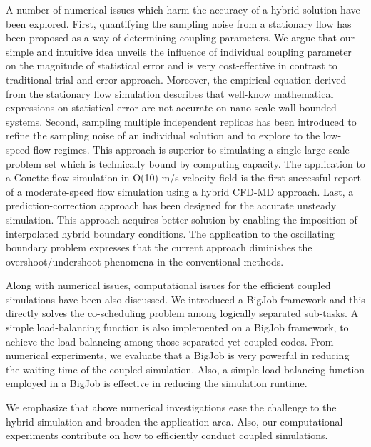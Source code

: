 \documentclass[]{aiaa-tc}%
\begin{document}
A number of numerical issues which harm the accuracy of a hybrid solution have been explored. First, quantifying the sampling noise from a stationary flow has been proposed as a way of determining coupling parameters. We argue that our simple and intuitive idea unveils the influence of individual coupling parameter on the magnitude of statistical error and is very cost-effective in contrast to traditional trial-and-error approach.
Moreover, the empirical equation derived from the stationary flow simulation describes that well-know mathematical expressions on statistical error are not accurate on nano-scale wall-bounded systems.
Second, sampling multiple independent replicas has been introduced to refine the sampling noise of an individual solution and to explore to the low-speed flow regimes. This approach is superior to simulating a single large-scale problem set which is technically bound by computing capacity. The application to a Couette flow simulation in O(10) m/s velocity field is the first successful report of a moderate-speed flow simulation using a hybrid CFD-MD approach.
Last, a prediction-correction approach has been designed for the accurate unsteady simulation. This approach acquires better solution by enabling the imposition of interpolated hybrid boundary conditions. The application to the oscillating boundary problem expresses that the current approach diminishes the overshoot/undershoot phenomena in the conventional methods.

Along with numerical issues, computational issues for the efficient coupled simulations have been also discussed. We introduced a BigJob framework and this directly solves the co-scheduling problem among logically separated sub-tasks. A simple load-balancing function is also implemented on a BigJob framework, to achieve the load-balancing among those separated-yet-coupled codes. From numerical experiments, we evaluate that a BigJob is very powerful in reducing the waiting time of the coupled simulation. Also, a simple load-balancing function employed in a BigJob is effective in reducing the simulation runtime.

We emphasize that above numerical investigations ease the challenge to the hybrid simulation and broaden the application area. Also, our computational experiments contribute on how to efficiently conduct coupled simulations.



\end{document}
